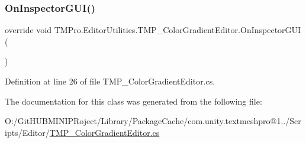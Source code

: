 \subsubsection{\texorpdfstring{OnInspectorGUI()}{OnInspectorGUI()}}
{\footnotesize\ttfamily override void T\+M\+Pro.\+Editor\+Utilities.\+T\+M\+P\+\_\+\+Color\+Gradient\+Editor.\+On\+Inspector\+G\+UI (\begin{DoxyParamCaption}{ }\end{DoxyParamCaption})}



Definition at line 26 of file T\+M\+P\+\_\+\+Color\+Gradient\+Editor.\+cs.



The documentation for this class was generated from the following file\+:\begin{DoxyCompactItemize}
\item 
O\+:/\+Git\+H\+U\+B\+M\+I\+N\+I\+P\+Roject/\+Library/\+Package\+Cache/com.\+unity.\+textmeshpro@1../\+Scripts/\+Editor/\mbox{\hyperlink{_t_m_p___color_gradient_editor_8cs}{T\+M\+P\+\_\+\+Color\+Gradient\+Editor.\+cs}}\end{DoxyCompactItemize}
